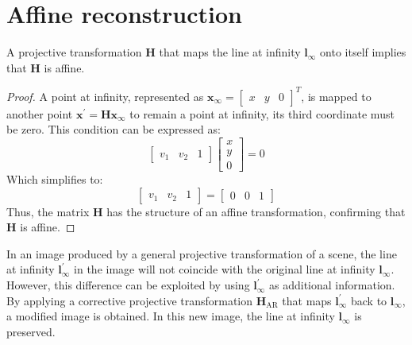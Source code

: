 \section{Affine reconstruction}

\begin{theorem}
    A projective transformation $\mathbf{H}$ that maps the line at infinity $\mathbf{l}_{\infty}$ onto itself implies that $\mathbf{H}$ is affine.
\end{theorem}
\begin{proof}
    A point at infinity, represented as $\mathbf{x}_{\infty}=\begin{bmatrix} x & y & 0 \end{bmatrix}^T$, is mapped to another point $\mathbf{x}^\prime=\mathbf{Hx}_{\infty}$ to remain a point at infinity, its third coordinate must be zero. 
    This condition can be expressed as:
    \[\begin{bmatrix} v_1 & v_2 & 1 \end{bmatrix} \begin{bmatrix} x \\ y \\ 0 \end{bmatrix}=0 \]    
    Which simplifies to:
    \[\begin{bmatrix} v_1 & v_2 & 1 \end{bmatrix} = \begin{bmatrix} 0 & 0 & 1 \end{bmatrix}\]
    Thus, the matrix $\mathbf{H}$ has the structure of an affine transformation, confirming that $\mathbf{H}$ is affine.
\end{proof}
In an image produced by a general projective transformation of a scene, the line at infinity $\mathbf{l}^\prime_{\infty}$ in the image will not coincide with the original line at infinity $\mathbf{l}_{\infty}$. 
However, this difference can be exploited by using $\mathbf{l}^\prime_{\infty}$ as additional information.
By applying a corrective projective transformation $\mathbf{H}_{\text{AR}}$ that maps $\mathbf{l}^\prime_{\infty}$ back to $\mathbf{l}_{\infty}$, a modified image is obtained.
In this new image, the line at infinity $\mathbf{l}_{\infty}$ is preserved.

